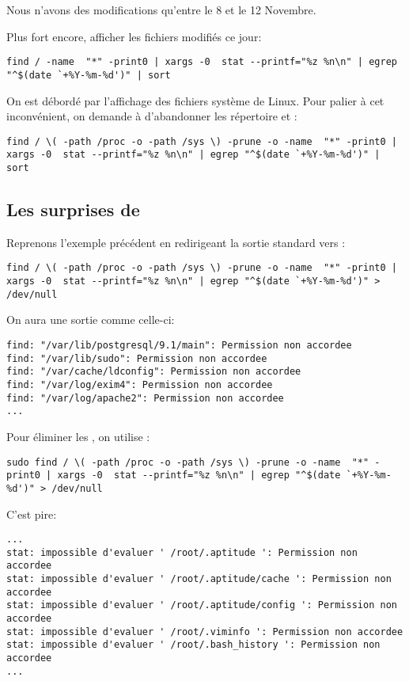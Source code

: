 Nous n'avons des modifications qu'entre le 8 et le 12 Novembre.

Plus fort encore, afficher les fichiers modifiés ce jour:

\begin{lstlisting}
find / -name  "*" -print0 | xargs -0  stat --printf="%z %n\n" | egrep "^$(date `+%Y-%m-%d')" | sort
\end{lstlisting}

On est débordé par l'affichage des fichiers système de Linux. Pour palier à cet inconvénient, on demande à  d'abandonner les répertoire  et :

\begin{lstlisting}
find / \( -path /proc -o -path /sys \) -prune -o -name  "*" -print0 | xargs -0  stat --printf="%z %n\n" | egrep "^$(date `+%Y-%m-%d')" | sort
\end{lstlisting}

\subsection{Les surprises de }
Reprenons l'exemple précédent en redirigeant la sortie standard vers :

\begin{lstlisting}
find / \( -path /proc -o -path /sys \) -prune -o -name  "*" -print0 | xargs -0  stat --printf="%z %n\n" | egrep "^$(date `+%Y-%m-%d')" > /dev/null
\end{lstlisting}

On aura une sortie comme celle-ci:

\begin{lstlisting}
find: "/var/lib/postgresql/9.1/main": Permission non accordee
find: "/var/lib/sudo": Permission non accordee
find: "/var/cache/ldconfig": Permission non accordee
find: "/var/log/exim4": Permission non accordee
find: "/var/log/apache2": Permission non accordee
...
\end{lstlisting}

Pour éliminer les , on utilise :

\begin{lstlisting}
sudo find / \( -path /proc -o -path /sys \) -prune -o -name  "*" -print0 | xargs -0  stat --printf="%z %n\n" | egrep "^$(date `+%Y-%m-%d')" > /dev/null
\end{lstlisting}

C'est pire:

\begin{lstlisting}
...
stat: impossible d'evaluer ' /root/.aptitude ': Permission non accordee
stat: impossible d'evaluer ' /root/.aptitude/cache ': Permission non accordee
stat: impossible d'evaluer ' /root/.aptitude/config ': Permission non accordee
stat: impossible d'evaluer ' /root/.viminfo ': Permission non accordee
stat: impossible d'evaluer ' /root/.bash_history ': Permission non accordee
...
\end{lstlisting}

